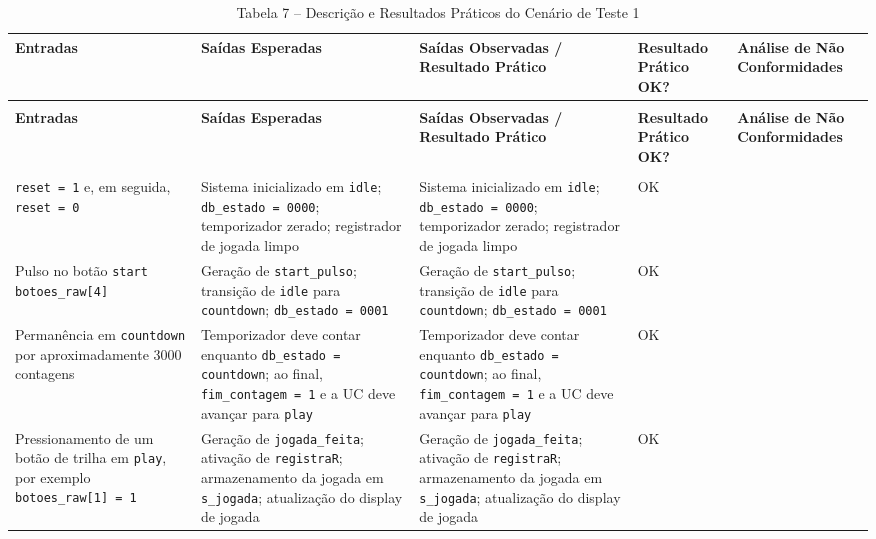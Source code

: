 \documentclass[a4paper,12pt,twoside]{article}
\begin{document}
\begin{longtable}{|>{\centering\arraybackslash}p{}|>{\centering\arraybackslash}p{}|>{\centering\arraybackslash}p{}|>{\centering\arraybackslash}p{}|>{\raggedright\arraybackslash}p{}|}
\caption{Tabela 7 -- Descrição e Resultados Práticos do Cenário de Teste 1} \label{tab:cenario1_pratico} \\
\hline
\textbf{Entradas} & \textbf{Saídas Esperadas} & \textbf{Saídas Observadas / Resultado Prático} & \textbf{Resultado Prático OK?} & \textbf{Análise de Não Conformidades} \\ \hline
\endfirsthead

\multicolumn{5}{c}{{\bfseries \tablename\ \thetable{} -- Continuação da página anterior}} \\
\hline
\textbf{Entradas} & \textbf{Saídas Esperadas} & \textbf{Saídas Observadas / Resultado Prático} & \textbf{Resultado Prático OK?} & \textbf{Análise de Não Conformidades} \\ \hline
\endhead

\hline \multicolumn{5}{|r|}{{Continua na próxima página...}} \\ \hline
\endfoot

\endlastfoot

\texttt{reset = 1} e, em seguida, \texttt{reset = 0}
& 
Sistema inicializado em \texttt{idle}; \texttt{db\_estado = 0000}; temporizador zerado; registrador de jogada limpo
& 
Sistema inicializado em \texttt{idle}; \texttt{db\_estado = 0000}; temporizador zerado; registrador de jogada limpo
&
OK
&
\\ \hline

Pulso no botão \texttt{start} \texttt{botoes\_raw[4]}
& 
Geração de \texttt{start\_pulso}; transição de \texttt{idle} para \texttt{countdown}; \texttt{db\_estado = 0001}
& 
Geração de \texttt{start\_pulso}; transição de \texttt{idle} para \texttt{countdown}; \texttt{db\_estado = 0001}
&
OK
&
\\ \hline

Permanência em \texttt{countdown} por aproximadamente 3000 contagens
& 
Temporizador deve contar enquanto \texttt{db\_estado = countdown}; ao final, \texttt{fim\_contagem = 1} e a UC deve avançar para \texttt{play}
& 
Temporizador deve contar enquanto \texttt{db\_estado = countdown}; ao final, \texttt{fim\_contagem = 1} e a UC deve avançar para \texttt{play}
&
OK
&
\\ \hline

Pressionamento de um botão de trilha em \texttt{play}, por exemplo \texttt{botoes\_raw[1] = 1}
& 
Geração de \texttt{jogada\_feita}; ativação de \texttt{registraR}; armazenamento da jogada em \texttt{s\_jogada}; atualização do display de jogada
& 
Geração de \texttt{jogada\_feita}; ativação de \texttt{registraR}; armazenamento da jogada em \texttt{s\_jogada}; atualização do display de jogada
&
OK
&
\\ \hline


\end{longtable}
\end{document}
